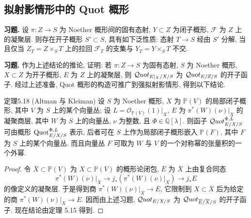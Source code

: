 \subsection{拟射影情形中的 Quot 概形}\label{ch05:sec5.6.1}
\textbf{习题.} 设 $\pi:Z\to S$ 为 Noether 概形间的固有态射, $Y\subset Z$ 为闭子概形, $\mathcal F$ 为 $Z$ 上的凝聚层. 则存在开子概形 $S'\subset S$, 具有如下泛性质: 态射 $T\to S$ 经由 $S'$ 分解, 当且仅当 $Z_T=Z\times_S T$ 上的拉回 $\mathcal F_T$ 的支集与 $Y_T=Y\times_S T$ 不交.

\textbf{习题.} 作为上述结论的推论, 证明: 若 $\pi:Z\to S$ 为固有态射, $S$ 为 Noether 概形, $X\subset Z$ 为开子概形, $E$ 为 $Z$ 上的凝聚层, 则 $\mathcal{Q}uot_{E|_X/X/S}$ 为 $\mathcal{Q}uot_{E/Z/S}$ 的开子函子.
经过上述准备, Quot 概形的构造可推广到强拟射影情形, 得到以下结论.
\begin{origstatement}{定理}{5.18}\label{ch05:thm5.18}
(Altman 与 Kleiman) 设 $S$ 为 Noether 概形, $X$ 为 $\mathbb P(V)$ 的局部闭子概形, 其中 $V$ 为 $S$ 上的某个向量丛; 设 $L=\mathcal O_{\mathbb P(V)}(1)|_X$, $E$ 为 $\pi^*(W)(\nu)|_X$ 的凝聚商层, 其中 $W$ 为 $S$ 上的向量丛, $\nu$ 为整数, 且 $\Phi\in\mathbb Q[\lambda]$. 则函子 $\mathcal{Q}uot^{\Phi,L}_{E/X/S}$ 可由概形 $\operatorname{Quot}^{\Phi,L}_{E/X/S}$ 表示, 后者可在 $S$ 上作为局部闭子概形嵌入 $\mathbb P(F)$, 其中 $F$ 为 $S$ 上的某个向量丛. 而且向量丛 $F$ 可取为 $W$ 与 $V$ 的一个对称幂的张量积的一个外幂.
\end{origstatement}
\begin{proof}
令 $\overline X\subset\mathbb P(V)$ 为 $X\subset\mathbb P(V)$ 的概形论闭包, $\overline E$ 为 $\overline X$ 上由复合同态
\[
 \pi^*(W)(\nu)|_{\overline X}\longrightarrow
 j_*(\pi^*(W)(\nu)|_X)\longrightarrow j_*E
\]
的像定义的凝聚层. 于是得到商 $\pi^*(W)(\nu)|_{\overline X}\to\overline E$, 它限制到 $X\subset\overline X$ 后为给定的商 $\pi^*(W)(\nu)|_X\to E$. 因而由上述习题, $\mathcal{Q}uot_{E/X/S}$ 为 $\mathcal{Q}uot_{\overline E/\overline X/S}$ 的开子函子. 现在结论由定理 5.15 得到.
\end{proof}

